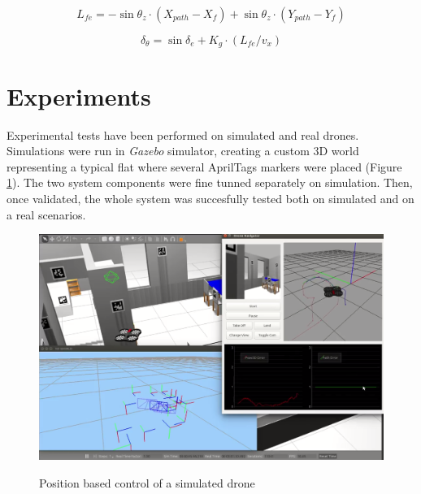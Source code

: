 \documentclass{styles/svproc}
\begin{document}
	\begin{equation}
	L_{fe} = - \sin \theta_{z} \cdot ( X_{path} - X_{f} ) + \sin \theta_{z} \cdot ( Y_{path} - Y_{f} )
	\label{eq:le}
	\end{equation}

	\begin{equation}
	\delta_{\theta} = \sin \delta_{e} +  K_{g} \cdot ( L_{fe} / v_{x} )
	\label{eq:deltatheta}
	\end{equation}

\section{Experiments}

        Experimental tests have been performed on simulated and real drones. Simulations were run in \textit{Gazebo} simulator, creating a custom 3D world representing a typical flat where several AprilTags markers were placed (Figure \ref{fig:simnavigation}). The two system components were fine tunned separately on simulation. Then, once validated, the whole system was succesfully tested both on simulated and on a real scenarios.
        
	\begin{figure}[h!]
          \begin{center}
            {\includegraphics[width=12cm]{simnavigation.png}}
          \end{center}
          \label{fig:simnavigation}
          \caption{Position based control of a simulated drone}
	\end{figure}
        
\end{document}
